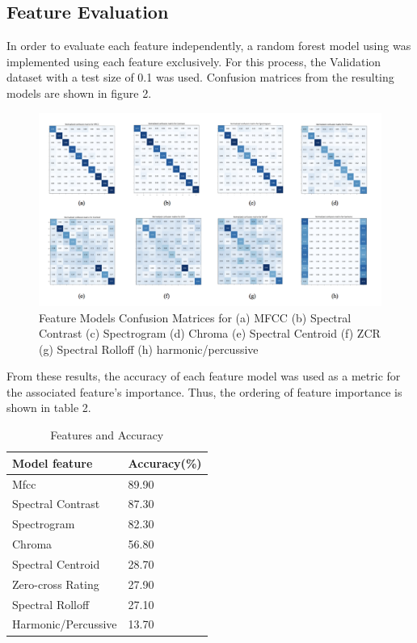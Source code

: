 \documentclass{article}
\begin{document}
\subsection{Feature Evaluation}

In order to evaluate each feature independently, a random forest model using was implemented using each feature exclusively. For this process, the Validation dataset with a test size of 0.1 was used. Confusion matrices from the resulting models are shown in figure 2. 

\begin{figure}[htb]
  \centering
  \includegraphics[width=1\linewidth]{cm_feat}
  \caption{Feature Models Confusion Matrices for (a) MFCC (b) Spectral Contrast (c) Spectrogram (d) Chroma (e) Spectral Centroid (f) ZCR (g) Spectral Rolloff (h) harmonic/percussive }
\end{figure}

From these results, the accuracy of each feature model was used as a metric for the associated feature's importance. Thus, the ordering of feature importance is shown in table 2.

\begin{table}[htb]
  \caption{Features and Accuracy}
  \label{Nsynth-Dataset}
  \centering
  \begin{tabular}{ll}
    \toprule
    Model feature & Accuracy(\%) \\
    \midrule
    Mfcc & 89.90 \\
    Spectral Contrast & 87.30\\
    Spectrogram & 82.30\\
    Chroma & 56.80\\
    Spectral Centroid & 28.70\\
    Zero-cross Rating & 27.90\\
    Spectral Rolloff & 27.10\\
    Harmonic/Percussive & 13.70\\
    \bottomrule
  \end{tabular}
\end{table}
\end{document}
